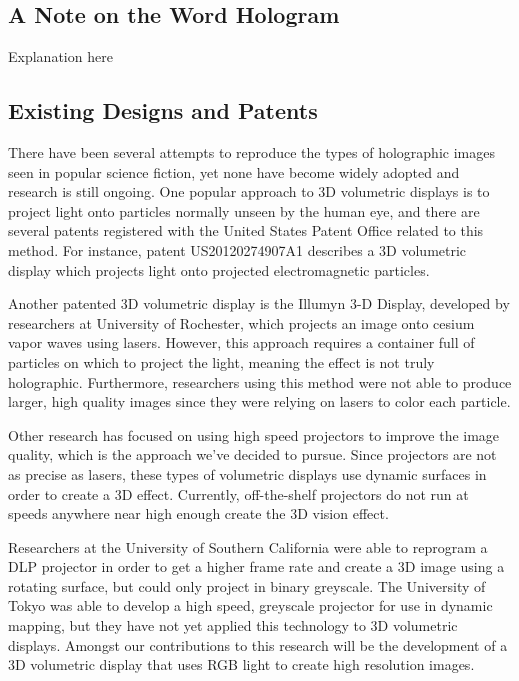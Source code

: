 \documentclass[12pt]{article}
\begin{document}
\subsection{A Note on the Word Hologram}
Explanation here

\subsection{Existing Designs and Patents}
There have been several attempts to reproduce the types of holographic images seen in popular science fiction, yet none have become widely adopted and research is still ongoing. One popular approach to 3D volumetric displays is to project light onto particles normally unseen by the human eye, and there are several patents registered with the United States Patent Office related to this method. For instance, patent US20120274907A1 describes a 3D volumetric display which projects light onto projected electromagnetic particles. 

Another patented 3D volumetric display is the Illumyn 3-D Display, developed by researchers at University of Rochester, which projects an image onto cesium vapor waves using lasers. However, this approach requires a container full of particles on which to project the light, meaning the effect is not truly holographic. Furthermore, researchers using this method were not able to produce larger, high quality images since they were relying on lasers to color each particle. 

Other research has focused on using high speed projectors to improve the image quality, which is the approach we've decided to pursue. Since projectors are not as precise as lasers, these types of volumetric displays use dynamic surfaces in order to create a 3D effect. Currently, off-the-shelf projectors do not run at speeds anywhere near high enough create the 3D vision effect.

Researchers at the University of Southern California were able to reprogram a DLP projector in order to get a higher frame rate and create a 3D image using a rotating surface, but could only project in binary greyscale. The University of Tokyo was able to develop a high speed, greyscale projector for use in dynamic mapping, but they have not yet applied this technology to 3D volumetric displays. Amongst our contributions to this research will be the development of a 3D volumetric display that uses RGB light to create high resolution images.
\end{document}
